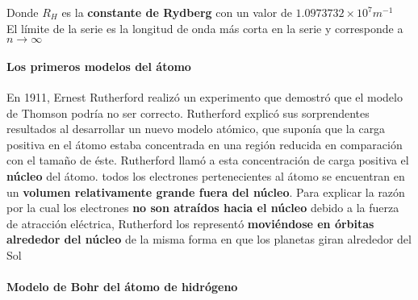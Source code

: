 \documentclass[10pt]{article}
\begin{document}
Donde $R_H$ es la \textbf{ constante de Rydberg} con un valor de $1.097 373 2 \times 10^7  m^{-1}$\\
El límite de la serie es la longitud de onda más corta en la serie y corresponde a $n \rightarrow \infty$

\paragraph{Los primeros modelos del átomo}
En 1911, Ernest Rutherford realizó un experimento que demostró que el modelo de Thomson podría no ser correcto. Rutherford explicó sus sorprendentes resultados al desarrollar un nuevo modelo atómico, que suponía que la carga positiva en el átomo estaba concentrada en una región reducida en comparación con el tamaño de éste. Rutherford llamó a esta concentración de carga positiva el \textbf{núcleo} del átomo. todos los electrones pertenecientes al átomo se encuentran en un \textbf{volumen relativamente grande fuera del núcleo}. Para explicar la razón por la cual los electrones \textbf{no son atraídos hacia el núcleo } debido a la fuerza de atracción eléctrica, Rutherford los representó \textbf{moviéndose en órbitas alrededor del núcleo} de la misma forma en que los planetas giran alrededor del Sol

\paragraph{Modelo de Bohr del átomo de hidrógeno}
\end{document}
